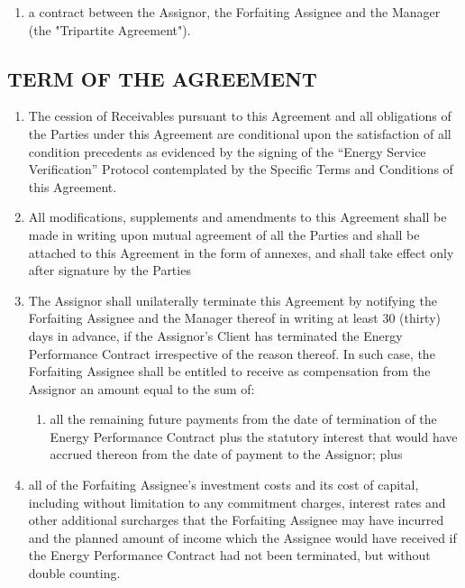 \documentclass[a4paper]{article}
\begin{document}
\begin{multicols}{2}
\begin{enumerate}
\begin{enumerate}
    \item{a contract between the Assignor, the Forfaiting Assignee and
        the Manager (the "Tripartite Agreement").}
    \end{enumerate}
  \end{enumerate}

  \subsection{TERM OF THE AGREEMENT}

  \begin{enumerate}

  \item{The cession of Receivables pursuant to this Agreement and all
      obligations of the Parties under this Agreement are conditional
      upon the satisfaction of all condition precedents as evidenced
      by the signing of the “Energy Service Verification” Protocol contemplated by
      the Specific Terms and Conditions of this Agreement.}

  \item{All modifications, supplements and amendments to this
      Agreement shall be made in writing upon mutual agreement of all
      the Parties and shall be attached to this Agreement in the form
      of annexes, and shall take effect only after signature by the
      Parties }

  \item{The Assignor shall unilaterally terminate this Agreement by
      notifying the Forfaiting Assignee and the Manager thereof in
      writing at least 30 (thirty) days in advance, if the Assignor’s
      Client has terminated the Energy Performance Contract
      irrespective of the reason thereof. In such case, the Forfaiting
      Assignee shall be entitled to receive as compensation from the
      Assignor an amount equal to the sum of: }

    \begin{enumerate}
    \item{all the remaining future payments from the date of
        termination of the Energy Performance Contract plus the
        statutory interest that would have accrued thereon from the
        date of payment to the Assignor; plus}
    \end{enumerate}

  \item{all of the Forfaiting Assignee’s investment costs and its cost
      of capital, including without limitation to any commitment
      charges, interest rates and other additional surcharges that the
      Forfaiting Assignee may have incurred and the planned amount of
      income which the Assignee would have received if the Energy
      Performance Contract had not been terminated, but without double
      counting.}


\end{enumerate}
\end{multicols}
\end{document}
